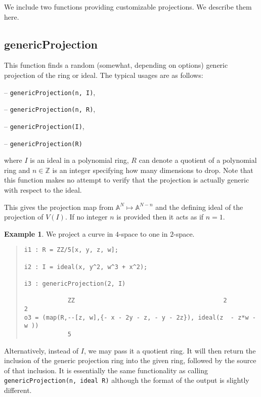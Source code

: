 \documentclass[11pt]{amsart}
\theoremstyle{definition}
\newtheorem{example}{Example}[section]
\begin{document}
We include two functions providing customizable projections. We describe them here. 

\subsection{genericProjection} 
This function finds a random (somewhat, depending on options) generic projection of the ring or ideal.
The typical usages are as follows: 
\vspace{0.5em}

-- {\tt genericProjection(n, I)},

-- {\tt genericProjection(n, R)},


-- {\tt genericProjection(I)},  

-- {\tt genericProjection(R)} 

\vspace{0.5em}
\noindent where 
$I$ is an ideal 
in a polynomial ring, 
$R$ can denote a quotient of a polynomial ring and 
$n\in \mathbb{Z}$ is
an integer specifying how many dimensions to drop.  Note that this function makes no attempt to verify that the projection is actually generic with respect to the ideal.


This gives the projection map from $\mathbb{A}^N \mapsto\mathbb{A}^{N-n}$ and the defining ideal of the projection of $V(I)$. If no integer $n$ is provided then it acts as if $n = 1$. 


\begin{example}	
    We project a curve in $4$-space to one in $2$-space.
    ~~
  {{\small\color{blue}
  \begin{quote}
\begin{verbatim}
i1 : R = ZZ/5[x, y, z, w];

i2 : I = ideal(x, y^2, w^3 + x^2);

i3 : genericProjection(2, I)

            ZZ                                         2          2
o3 = (map(R,--[z, w],{- x - 2y - z, - y - 2z}), ideal(z  - z*w - w ))                   
            5
\end{verbatim}
\end{quote}
    }}
\end{example}\vspace{-1em}
Alternatively, instead of {$I$}, we may pass it a quotient ring.  It will then return the inclusion of the generic projection ring into the given ring, followed by the source of that inclusion.  It is essentially the same functionality as calling {\tt genericProjection(n, ideal R)} although the format of the output is slightly different. 
\end{document}
